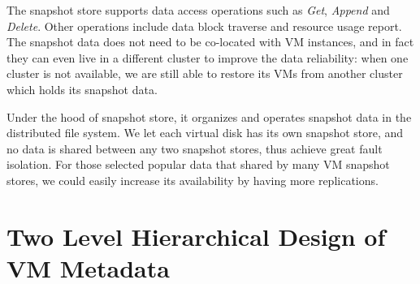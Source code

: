 The snapshot store 
supports data access operations such as \emph{Get}, \emph{Append} and \emph{Delete}.
Other operations include data block traverse and resource usage report.
The snapshot data does not need to be
co-located with VM instances, and in fact they can even live in a different cluster to improve the 
data reliability: when one cluster is not available, we are still able to restore its VMs from another cluster which
holds its snapshot data. 

Under the hood of snapshot store, it organizes and operates snapshot data 
in the distributed file system. We let each virtual disk has its own snapshot store, 
and no data is shared between
any two snapshot stores, thus achieve great fault isolation. For those selected popular data
that shared by many VM snapshot stores, we could easily increase its availability by having more replications.




\section{Two Level Hierarchical Design of VM Metadata}
\label{overview:meta}

